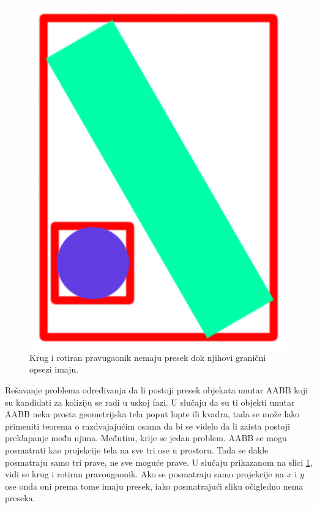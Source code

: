 \documentclass[12pt,oneside]{memoir}
\begin{document}
\begin{figure}[h!]
	\begin{center}
	\includegraphics[scale=0.2]{2dfalseCol.png}
	\end{center}
	\caption{Krug i rotiran pravugaonik nemaju presek dok njihovi granični opsezi imaju.}
	\label{fig:2dfalse}
\end{figure}

Rešavanje problema određivanja da li postoji presek objekata unutar AABB koji su kandidati za koliziju 
se radi u uskoj fazi.
U slučaju da su ti objekti unutar AABB neka prosta geometrijska tela poput
lopte ili kvadra, tada se može lako primeniti teorema o razdvajajućim osama da bi se videlo da li zaista 
postoji preklapanje među njima. Međutim, krije se jedan problem.
AABB se mogu posmatrati kao projekcije tela na sve tri ose u prostoru.
Tada se dakle posmatraju samo tri prave, ne sve moguće prave. 
U slučaju prikazanom na slici \ref{fig:2dfalse}, vidi se krug i rotiran pravougaonik. 
Ako se posmatraju samo projekcije na $x$ i $y$ ose onda oni prema tome imaju presek, iako posmatrajući sliku očigledno nema preseka.
\end{document}

